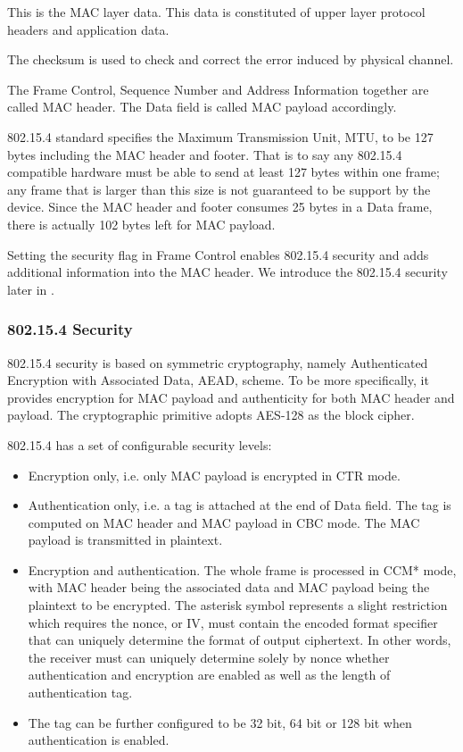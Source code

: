 \begin{description}[style=nextline]
	\item[\textbf{Data}]
	This is the MAC layer data. This data is constituted of upper layer protocol headers and application data.
	
	\item[\textbf{Frame Checksum}]
	The checksum is used to check and correct the error induced by physical channel.
\end{description}

The Frame Control, Sequence Number and Address Information together are called MAC header. The Data field is called MAC payload accordingly. 

802.15.4 standard specifies the Maximum Transmission Unit, MTU, to be 127 bytes including the MAC header and footer. That is to say any 802.15.4 compatible hardware must be able to send at least 127 bytes within one frame; any frame that is larger than this size is not guaranteed to be support by the device. Since the MAC header and footer consumes 25 bytes in a Data frame, there is actually 102 bytes left for MAC payload.

Setting the security flag in Frame Control enables 802.15.4 security and adds additional information into the MAC header. We introduce the 802.15.4 security later in .

\subsubsection{802.15.4 Security} \label{Subsubsec: 802154 Sec}
802.15.4 security is based on symmetric cryptography, namely Authenticated Encryption with Associated Data, AEAD, scheme. To be more specifically, it provides encryption for MAC payload and authenticity for both MAC header and payload. The cryptographic primitive adopts AES-128 as the block cipher.

802.15.4 has a set of configurable security levels:
\begin{itemize}
\item Encryption only, i.e. only MAC payload is encrypted in CTR mode.
\item Authentication only, i.e. a tag is attached at the end of Data field. The tag is computed on MAC header and MAC payload in CBC mode. The MAC payload is transmitted in plaintext.
\item Encryption and authentication. The whole frame is processed in CCM*\cite{802154} mode, with MAC header being the associated data and MAC payload being the plaintext to be encrypted. The asterisk symbol represents a slight restriction which requires the nonce, or IV, must contain the encoded format specifier that can uniquely determine the format of output ciphertext. In other words, the receiver must can uniquely determine solely by nonce whether authentication and encryption are enabled as well as the length of authentication tag.
\item The tag can be further configured to be 32 bit, 64 bit or 128 bit when authentication is enabled.
\end{itemize}

